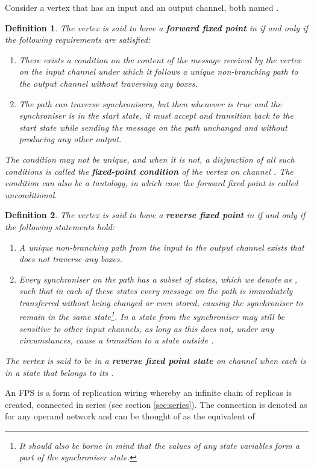 \documentclass[11pt]{report}
\newtheorem*{mydef}{Definition}
\begin{document}
Consider a vertex  that has an input and an output channel, both named .
\begin{mydef} The vertex  is said to have a {\bf forward fixed point} in  if and only if the following requirements are satisfied:
\begin{enumerate}
\item There exists a condition  on the content of the message  received by the vertex on the input channel  under which it follows a unique non-branching path to the output channel  without traversing any boxes.
\item The path can traverse synchronisers, but then whenever  is true and the synchroniser is in the start state, it must accept  and transition back to the start state while sending the message  on the path unchanged and without producing any other output.
\end{enumerate}
The condition  may not be unique, and when it is not,  a disjunction of all such conditions is called the {\bf fixed-point condition} of the vertex on channel . The condition can also be a tautology, in which case the forward fixed point is called unconditional.
\end{mydef}
\begin{mydef}
The vertex  is said to have a {\bf reverse fixed point} in  if and only if the following statements hold:
\begin{enumerate}
\item A unique non-branching path from the input to the output channel  exists that does not traverse any boxes.
\item Every synchroniser  on the path has a subset of states, which we denote as , such that in each of these states every message on the path is immediately transferred without being changed or even stored, causing the synchroniser to remain in the same state\footnote{It should also be borne in mind that the values of any state variables form a part of the synchroniser state.}. In a state from  the synchroniser  may still be sensitive to other input channels, as long as this does not, under any circumstances, cause a transition to a state outside .
\end{enumerate}
The vertex  is said to be in a {\bf reverse fixed point state} on channel  when each  is in a state that belongs to its .
\end{mydef}
An FPS is a form of replication wiring whereby an infinite chain of replicas is created, connected in series (see section \ref{sec:series}). The connection is denoted as  for any operand network  and can be thought of as the equivalent of
\end{document}
